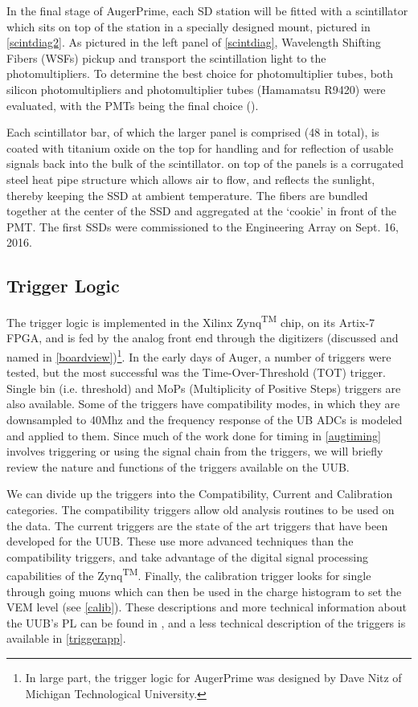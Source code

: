 In the final stage of AugerPrime, each SD station will be fitted with a scintillator which sits on top of the station in a specially designed mount, pictured in \autoref{scintdiag2}. As pictured in the left panel of \autoref{scintdiag}, Wavelength Shifting Fibers (WSFs) pickup and transport the scintillation light to the photomultipliers. To determine the best choice for photomultiplier tubes, both silicon photomultipliers and photomultiplier tubes (Hamamatsu R9420) were evaluated, with the PMTs being the final choice (\cite{augerscint,firstdat}). 

Each scintillator bar, of which the larger panel is comprised (48 in total), is coated with titanium oxide on the top for handling and for reflection of usable signals back into the bulk of the scintillator. on top of the panels is a corrugated steel heat pipe structure which allows air to flow, and reflects the sunlight, thereby keeping the SSD at ambient temperature. The fibers are bundled together at the center of the SSD and aggregated at the `cookie' in front of the PMT. The first SSDs were commissioned to the Engineering Array on Sept. 16, 2016.

\subsection{Trigger Logic}%
The trigger logic is implemented in the Xilinx Zynq\textsuperscript{TM} chip, on its Artix-7 FPGA, and is fed by the analog front end through the digitizers (discussed and named in \autoref{boardview})\footnote{In large part, the trigger logic for AugerPrime was designed by Dave Nitz of Michigan Technological University.}. In the early days of Auger, a number of triggers were tested, but the most successful was the Time-Over-Threshold (TOT) trigger. Single bin (i.e. threshold) and MoPs (Multiplicity of Positive Steps) triggers are also available. Some of the triggers have compatibility modes, in which they are downsampled to 40Mhz and the frequency response of the UB ADCs is modeled and applied to them. Since much of the work done for timing in \autoref{augtiming} involves triggering or using the signal chain from the triggers, we will briefly review the nature and functions of the triggers available on the UUB.

We can divide up the triggers into the Compatibility, Current and Calibration categories. The compatibility triggers allow old analysis routines to be used on the data. The current triggers are the state of the art triggers that have been developed for the UUB. These use more advanced techniques than the compatibility triggers, and take advantage of the digital signal processing capabilities of the Zynq\textsuperscript{TM}. Finally, the calibration trigger looks for single through going muons which can then be used in the charge histogram to set the VEM level (see \autoref{calib}). These descriptions and more technical information about the UUB's PL can be found in , and a less technical description of the triggers is available in \autoref{triggerapp}.

